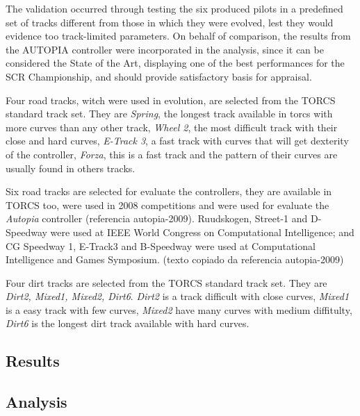 	The validation occurred through testing the six produced pilots in a predefined set of tracks different from those
	in which they were evolved, lest they would evidence too track-limited parameters. On behalf of comparison, the
	results from the AUTOPIA controller were incorporated in the analysis, since it can be considered the State of
	the Art, displaying one of the best performances for the SCR Championship, and should provide satisfactory basis
	for appraisal.

	Four road tracks, witch were used in evolution, are selected from the TORCS standard track set. They are \emph{Spring}, 
	the longest track available in torcs with more curves than any other track, \emph{Wheel 2}, the most difficult track 
	with their close and hard curves, \emph{E-Track 3}, a fast track with curves that will get dexterity of the controller, 
	\emph{Forza}, this is a fast track and the pattern of their curves are usually found in others tracks.

	Six road tracks are selected for evaluate the controllers, they are available in TORCS too, were used in 2008 competitions 
	and were used for evaluate the \emph{Autopia} controller (referencia autopia-2009). Ruudskogen, Street-1 and D-Speedway were 
	used at IEEE World Congress on Computational Intelligence; and CG Speedway 1, E-Track3 and B-Speedway were used 
	at Computational Intelligence and Games Symposium. (texto copiado da referencia autopia-2009)

	Four dirt tracks are selected from the TORCS standard track set. They are \emph{Dirt2, Mixed1, Mixed2, Dirt6}. 
	\emph{Dirt2} is a track difficult with close curves, \emph{Mixed1} is a easy track with few curves, \emph{Mixed2} have many 
	curves with medium diffitulty, \emph{Dirt6} is the longest dirt track available with hard curves.
	
\subsection{Results} \label{subsec:Results}

	
\subsection{Analysis} \label{subsec:Analysis}
	
	
	